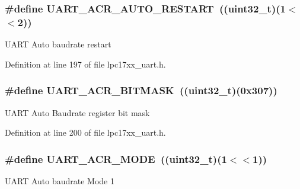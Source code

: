\subsubsection[{\texorpdfstring{U\+A\+R\+T\+\_\+\+A\+C\+R\+\_\+\+A\+U\+T\+O\+\_\+\+R\+E\+S\+T\+A\+RT}{UART_ACR_AUTO_RESTART}}]{\setlength{\rightskip}{0pt plus 5cm}\#define U\+A\+R\+T\+\_\+\+A\+C\+R\+\_\+\+A\+U\+T\+O\+\_\+\+R\+E\+S\+T\+A\+RT~(({\bf uint32\+\_\+t})(1$<$$<$2))}\hypertarget{group___u_a_r_t___private___macros_ga20674ae8e687d2161ef3fd88f2649036}{}\label{group___u_a_r_t___private___macros_ga20674ae8e687d2161ef3fd88f2649036}
U\+A\+RT Auto baudrate restart 

Definition at line 197 of file lpc17xx\+\_\+uart.\+h.

\subsubsection[{\texorpdfstring{U\+A\+R\+T\+\_\+\+A\+C\+R\+\_\+\+B\+I\+T\+M\+A\+SK}{UART_ACR_BITMASK}}]{\setlength{\rightskip}{0pt plus 5cm}\#define U\+A\+R\+T\+\_\+\+A\+C\+R\+\_\+\+B\+I\+T\+M\+A\+SK~(({\bf uint32\+\_\+t})(0x307))}\hypertarget{group___u_a_r_t___private___macros_gae83190d58b42771ee951dfe88aada715}{}\label{group___u_a_r_t___private___macros_gae83190d58b42771ee951dfe88aada715}
U\+A\+RT Auto Baudrate register bit mask 

Definition at line 200 of file lpc17xx\+\_\+uart.\+h.

\subsubsection[{\texorpdfstring{U\+A\+R\+T\+\_\+\+A\+C\+R\+\_\+\+M\+O\+DE}{UART_ACR_MODE}}]{\setlength{\rightskip}{0pt plus 5cm}\#define U\+A\+R\+T\+\_\+\+A\+C\+R\+\_\+\+M\+O\+DE~(({\bf uint32\+\_\+t})(1$<$$<$1))}\hypertarget{group___u_a_r_t___private___macros_ga706e927ee7abf7027eb88b1e13dd2a92}{}\label{group___u_a_r_t___private___macros_ga706e927ee7abf7027eb88b1e13dd2a92}
U\+A\+RT Auto baudrate Mode 1 

